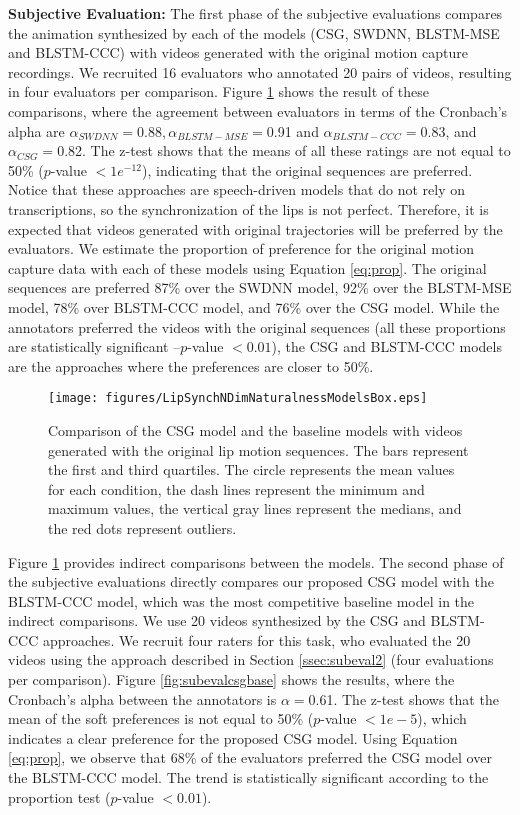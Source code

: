 \documentclass[10pt,journal,compsoc]{IEEEtran}
\begin{document}
\noindent
\textbf{Subjective Evaluation:}
The first phase of the subjective evaluations compares the animation synthesized by each of the models (CSG, SWDNN, BLSTM-MSE and BLSTM-CCC) with videos generated with the original motion capture recordings. We recruited 16 evaluators who annotated 20 pairs of videos, resulting in four evaluators per comparison. Figure \ref{fig:subeval} shows the result of these comparisons, where the agreement between evaluators in terms of the Cronbach's alpha are $\alpha_\mathit{SWDNN}=$0.88$, \alpha_\mathit{BLSTM-MSE}=$0.91 and   $\alpha_\mathit{BLSTM-CCC}=$0.83,  and $\alpha_\mathit{CSG}=$0.82. The z-test shows that the means of all these ratings are not equal to 50\% ($p$-value $<1e^{-12}$), indicating that the original sequences are preferred. Notice that these approaches are speech-driven models that do not rely on transcriptions, so the synchronization of the lips is not perfect. Therefore, it is expected that videos generated with original trajectories will be preferred by the evaluators. We estimate the proportion of preference for the original motion capture data with each of these models using Equation \ref{eq:prop}. The original sequences are preferred 87\% over the SWDNN model, 92\% over the BLSTM-MSE model, 78\% over BLSTM-CCC model, and 76\% over the CSG model. While the annotators preferred the videos with the original sequences (all these proportions are statistically significant --$p$-value $<0.01$), the CSG and BLSTM-CCC models are the approaches where the preferences are closer to 50\%. 

\begin{figure}
	\centering
	\texttt{[image: figures/LipSynchNDimNaturalnessModelsBox.eps]}
	\caption{Comparison of the CSG model and the baseline models with videos generated with the original lip motion sequences. The bars represent the first and third quartiles. The circle represents the mean values for each condition, the dash lines represent the minimum and maximum values, the vertical gray lines represent the medians, and the red dots represent outliers.}
	\label{fig:subeval}
\end{figure}

Figure \ref{fig:subeval} provides indirect comparisons between the models. The second phase of the subjective evaluations directly compares our proposed CSG model with the BLSTM-CCC model, which was the most competitive baseline model in the indirect comparisons. We use 20 videos synthesized by the CSG and BLSTM-CCC approaches. We recruit four raters for this task, who evaluated the 20 videos using the approach described in Section \ref{ssec:subeval2} (four evaluations per comparison). Figure \ref{fig:subevalcsgbase} shows the results, where the Cronbach's alpha between the annotators is $\alpha=$0.61. The z-test shows that the mean of the soft preferences is not equal to 50\% ($p$-value $<1e-5$), which indicates a clear preference for the proposed CSG model. Using Equation \ref{eq:prop}, we observe that 68\% of the evaluators preferred the CSG model over the BLSTM-CCC model. The trend is statistically significant according to the proportion test ($p$-value $ < 0.01$). 
\end{document}
